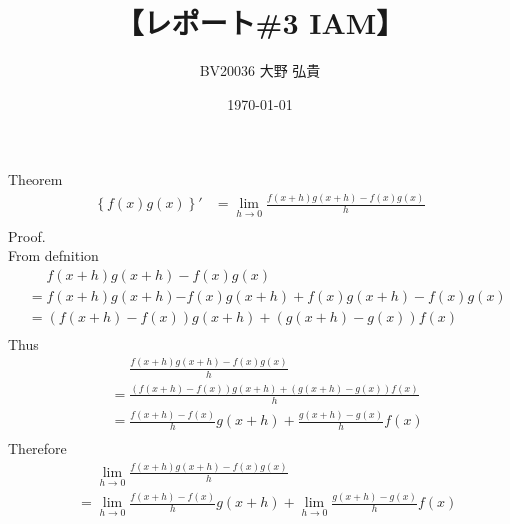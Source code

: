 \documentclass[titlepage, a4paper, 11pt, dvipdfmx]{jsarticle}
\title{\Huge【レポート\#3 IAM】}
\date{\today}%
\author{\Large BV20036 \quad 大野 弘貴}%
\begin{document}
\maketitle
{}
\newpage
{}



Theorem
\begin{align} 
  \left\{f(x)g(x)\right\}' 
  &= \lim_{h\rightarrow 0}\frac{f\left(x+h\right)g\left(x+h\right)-f\left(x\right)g\left(x\right)}{h}\\\ 
\end{align}
Proof. \\
From defnition
\begin{align}  
  & \ \ \ \ \ \ f\left(x+h\right)g\left(x+h\right)-f\left(x\right)g\left(x\right)\\\
   &= f\left(x+h\right)g\left(x+h\right){-f(x)g(x+h)+f(x)g(x+h)}-f\left(x\right)g\left(x\right)\\\ 
   &= \left(f\left(x+h\right)-f(x)\right)g\left(x+h\right)+\left(g(x+h)-g\left(x\right)\right)f\left(x\right)\\\ 
\end{align}
Thus
\begin{align} 
  & \ \ \ \ \ \ \frac{f\left(x+h\right)g\left(x+h\right)-f\left(x\right)g\left(x\right)}{h} \\\ 
  &= \frac{\left(f\left(x+h\right)-f(x)\right)g\left(x+h\right)+\left(g(x+h)-g\left(x\right)\right)f\left(x\right)}{h}\\\ 
  &= \frac{f\left(x+h\right)-f(x)}{h}g\left(x+h\right)+\frac{g(x+h)-g\left(x\right)}{h}f\left(x\right)\\\ 
\end{align}
Therefore
\begin{align}  
  & \ \ \ \ \ \ \lim_{h\to 0}\frac{f\left(x+h\right)g\left(x+h\right)-f\left(x\right)g\left(x\right)}{h} \\\ 
  &= \lim_{h\to0}\frac{f\left(x+h\right)-f(x)}{h}g\left(x+h\right)+\lim_{h\to0}\frac{g(x+h)-g\left(x\right)}{h}f\left(x\right)\\\ 
\end{align}
\end{document}
